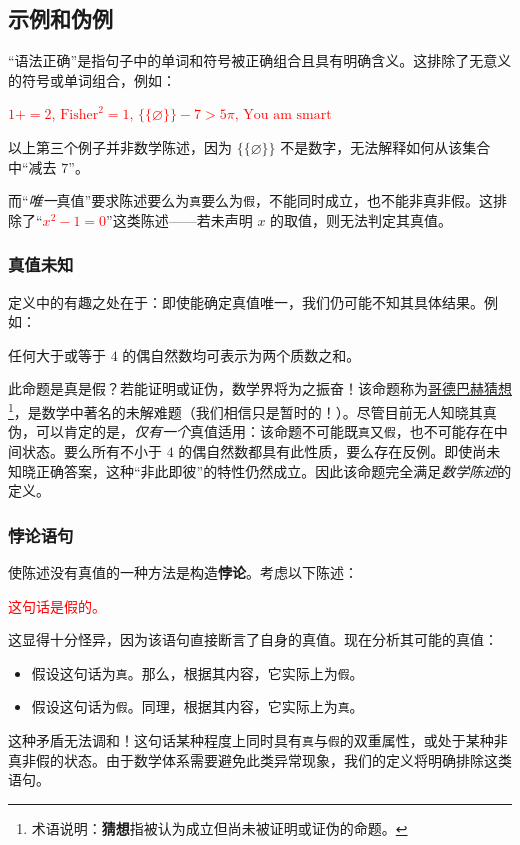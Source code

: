 \subsection{示例和伪例}

``语法正确''是指句子中的单词和符号被正确组合且具有明确含义。这排除了无意义的符号或单词组合，例如：
\begin{center}
    \textcolor{red}{$1+ = 2$, $\text{Fisher}^2 = 1$, $\big\{\{\varnothing\}\big\} - 7 > 5\pi$, $\text{You am smart}$}
\end{center}
以上第三个例子并非数学陈述，因为 $\big\{\{\varnothing\}\big\}$ 不是数字，无法解释如何从该集合中``减去 $7$''。

而``\emph{唯一}真值''要求陈述要么为\verb|真|要么为\verb|假|，不能同时成立，也不能非真非假。这排除了``\textcolor{red}{$x^2 - 1 = 0$}''这类陈述——若未声明 $x$ 的取值，则无法判定其真值。

\subsubsection*{真值未知}

定义中的有趣之处在于：即使能确定真值唯一，我们仍可能不知其具体结果。例如：
\begin{center}
    \textcolor{olivegreen}{任何大于或等于 $4$ 的偶自然数均可表示为两个质数之和。}
\end{center}

此命题是真是假？若能证明或证伪，数学界将为之振奋！该命题称为\href{https://baike.baidu.com/item/哥德巴赫猜想/72364}{哥德巴赫猜想}\footnote{术语说明：\textbf{猜想}指被认为成立但尚未被证明或证伪的命题。}，是数学中著名的未解难题（我们相信只是暂时的！）。尽管目前无人知晓其真伪，可以肯定的是，\emph{仅有一个}真值适用：该命题不可能既\verb|真|又\verb|假|，也不可能存在中间状态。要么所有不小于 $4$ 的偶自然数都具有此性质，要么存在反例。即使尚未知晓正确答案，这种``非此即彼''的特性仍然成立。因此该命题完全满足\emph{数学陈述}的定义。

\subsubsection*{悖论语句}

使陈述没有真值的一种方法是构造\textbf{悖论}。考虑以下陈述：
\begin{center}
    \textcolor{red}{这句话是假的。}
\end{center}
这显得十分怪异，因为该语句直接断言了自身的真值。现在分析其可能的真值：
\begin{itemize}
    \item 假设这句话为\verb|真|。那么，根据其内容，它实际上为\verb|假|。
    \item 假设这句话为\verb|假|。同理，根据其内容，它实际上为\verb|真|。
\end{itemize}
这种矛盾无法调和！这句话某种程度上同时具有\verb|真|与\verb|假|的双重属性，或处于某种非真非假的状态。由于数学体系需要避免此类异常现象，我们的定义将明确排除这类语句。

